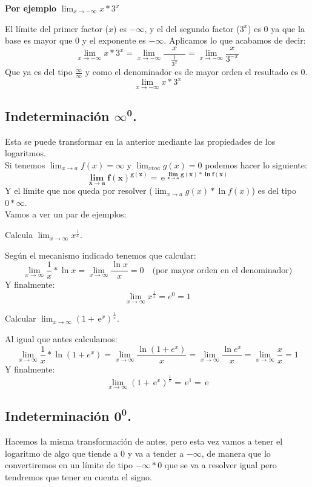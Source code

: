 \documentclass[a4paper,11pt,answers]{exam}
\newcommand\ddfrac[2]{\frac{\displaystyle #1}{\displaystyle #2}}
\newcommand{\e}{\,\mathrm{e}}
\begin{document}
\textbf{Por ejemplo} $\lim_{x \to -\infty} x*3^x$
\begin{solution}
El límite del primer factor ($x$) es $-\infty$, y el del segundo factor ($3^x$) es 0 ya que la base es mayor que 0 y el exponente es $-\infty$. Aplicamos lo que acabamos de decir:
\[\lim_{x \to -\infty} x*3^x = \lim_{x \to -\infty} \ddfrac{\quad x\quad }{\frac{1}{3^x}} = \lim_{x \to -\infty} \frac{x}{3^{-x}}\]
Que ya es del tipo $\frac{\infty}{\infty}$ y como el denominador es de mayor orden el resultado es 0.
\[\lim_{x \to -\infty} x*3^x\]
\end{solution}

\subsection{Indeterminación $\boldsymbol{\infty^0}$.}
Esta se puede transformar en la anterior mediante las propiedades de los logaritmos.\\
Si tenemos $\lim_{x \to a} f(x) = \infty$ y $\lim_{x to a} g(x) = 0$ podemos hacer lo siguiente:
\[\boldsymbol{\lim_{x \to a} f(x)^{g(x)} = \e^{\,\displaystyle\lim_{x \to a} g(x)*\ln f(x)}}\]
Y el límite que nos queda por resolver ($\lim_{x \to a} g(x)*\ln f(x)$) es del tipo $0*\infty$.\\

Vamos a ver un par de ejemplos:
\begin{questions}
\question Calcula $\lim_{x \to \infty} x^\frac{1}{x}$.
\begin{solution}
Según el mecanismo indicado tenemos que calcular:
\[\lim_{x \to \infty} \frac{1}{x}*\ln x = \lim_{x \to \infty} \frac{\ln x}{x} = 0 \quad \text{(por mayor orden en el denominador)}\]
Y finalmente:
\[\lim_{x \to \infty} x^\frac{1}{x} = e^0 = 1\]
\end{solution}

\question Calcular $\lim_{x \to \infty} \left(1 + \e^x \right)^\frac{1}{x}$.
\begin{solution}
Al igual que antes calculamos:
\[\lim_{x \to \infty} \frac{1}{x}*\ln (1 + e^x) = \lim_{x \to \infty} \frac{\ln (1 + e^x)}{x} = \lim_{x \to \infty} \frac{\ln e^x}{x} =
\lim_{x \to \infty} \frac{x}{x} = 1\]
Y finalmente:
\[\lim_{x \to \infty} \left(1 + \e^x \right)^\frac{1}{x} = \e^1 = \e\]
\end{solution}
\end{questions}

\subsection{Indeterminación $\boldsymbol{0^0}$.}
Hacemos la misma transformación de antes, pero esta vez vamos a tener el logaritmo de algo que tiende a 0 y va a tender a $-\infty$, de manera que lo convertiremos en un límite de tipo $-\infty * 0$ que se va a resolver igual pero tendremos que tener en cuenta el signo.
\end{document}
